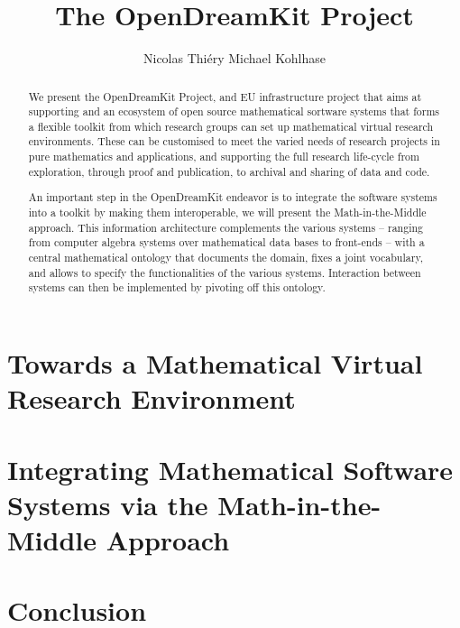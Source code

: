 \documentclass[orivec]{llncs}
\title{The OpenDreamKit Project}
\author{Nicolas Thi\'ery\inst{1} Michael Kohlhase\inst{2}}
\institute{Universit\'e Paris-Sud, Paris, France\and
Jacobs University, Bremen, Germany}
\begin{document}
\maketitle
\begin{abstract}
  We present the OpenDreamKit Project, and EU infrastructure project that aims at
  supporting and an ecosystem of open source mathematical sortware systems that forms a
  flexible toolkit from which research groups can set up mathematical virtual research
  environments. These can be customised to meet the varied needs of research projects in
  pure mathematics and applications, and supporting the full research life-cycle from
  exploration, through proof and publication, to archival and sharing of data and
  code. 

  An important step in the OpenDreamKit endeavor is to integrate the software systems into
  a toolkit by making them interoperable, we will present the Math-in-the-Middle
  approach. This information architecture complements the various systems -- ranging
  from computer algebra systems over mathematical data bases to front-ends -- with a
  central mathematical ontology that documents the domain, fixes a joint vocabulary, and
  allows to specify the functionalities of the various systems. Interaction between
  systems can then be implemented by pivoting off this ontology.
\end{abstract}

\section{Towards a Mathematical Virtual Research Environment}

\section{Integrating Mathematical Software Systems via the Math-in-the-Middle Approach}
\section{Conclusion}

\printbibliography
\end{document}

